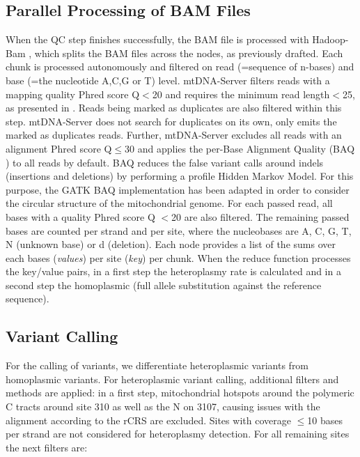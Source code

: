 \subsection{Parallel Processing of BAM Files}\label{settings}
When the QC step finishes successfully, the BAM file is processed with Hadoop-Bam \cite{Niemenmaa2012}, which splits the BAM files across the nodes, as previously drafted. Each chunk is processed autonomously and filtered on read (=sequence of n-bases) and base (=the nucleotide A,C,G or T) level. mtDNA-Server filters reads with a mapping quality Phred score Q$<$20  and requires the minimum read length$<$25, as presented in \cite{Zhidkov2011}. Reads being marked as duplicates are also filtered within this step. mtDNA-Server does not search for duplicates on its own, only emits the marked as duplicates reads. Further, mtDNA-Server excludes all reads with an alignment Phred score Q$\leq$30 and applies the per-Base Alignment Quality (BAQ \cite{Li2011}) to all reads by default. BAQ reduces the false variant calls around indels (insertions and deletions) by performing a profile Hidden Markov Model. For this purpose, the GATK \cite{McKenna2010} BAQ implementation has been adapted in order to consider the circular structure of the mitochondrial genome. For each passed read, all bases with a quality Phred score Q $<$20 are also filtered. The remaining passed bases are counted per strand and per site, where the nucleobases are A, C, G, T, N (unknown base) or d (deletion). Each node provides a list of the sums over each bases (\textit{values}) per site (\textit{key}) per chunk.
When the reduce function processes the key/value pairs, in a first step the heteroplasmy rate is calculated and in a second step the homoplasmic (full allele substitution against the reference sequence).
\subsection{Variant Calling}
For the calling of variants, we differentiate heteroplasmic variants from homoplasmic variants. For heteroplasmic variant calling, additional filters and methods are applied: in a first step, mitochondrial hotspots around the polymeric C tracts around site 310 as well as the N on 3107, causing issues with the alignment according to the rCRS are excluded. Sites with coverage $\leq$10 bases per strand are not considered for heteroplasmy detection. For all remaining sites the next filters are:

